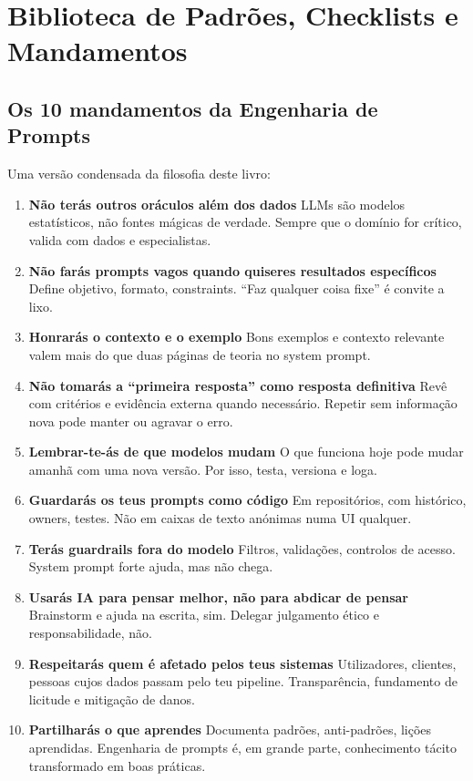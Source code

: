 \chapter{Biblioteca de Padrões, Checklists e Mandamentos}
\label{ap:padroes}

\section{Os 10 mandamentos da Engenharia de Prompts}

Uma versão condensada da filosofia deste livro:

\begin{enumerate}[leftmargin=*]
\item \textbf{Não terás outros oráculos além dos dados}
LLMs são modelos estatísticos, não fontes mágicas de verdade. Sempre que o domínio for crítico, valida com dados e especialistas.
\item \textbf{Não farás prompts vagos quando quiseres resultados específicos}
Define objetivo, formato, constraints. “Faz qualquer coisa fixe” é convite a lixo.
\item \textbf{Honrarás o contexto e o exemplo}
Bons exemplos e contexto relevante valem mais do que duas páginas de teoria no system prompt.
\item \textbf{Não tomarás a “primeira resposta” como resposta definitiva}
Revê com critérios e evidência externa quando necessário. Repetir sem informação nova pode manter ou agravar o erro.
\item \textbf{Lembrar-te-ás de que modelos mudam}
O que funciona hoje pode mudar amanhã com uma nova versão. Por isso, testa, versiona e loga.
\item \textbf{Guardarás os teus prompts como código}
Em repositórios, com histórico, owners, testes. Não em caixas de texto anónimas numa UI qualquer.
\item \textbf{Terás guardrails fora do modelo}
Filtros, validações, controlos de acesso. System prompt forte ajuda, mas não chega.
\item \textbf{Usarás IA para pensar melhor, não para abdicar de pensar}
Brainstorm e ajuda na escrita, sim. Delegar julgamento ético e responsabilidade, não.
\item \textbf{Respeitarás quem é afetado pelos teus sistemas}
Utilizadores, clientes, pessoas cujos dados passam pelo teu pipeline. Transparência, fundamento de licitude e mitigação de danos.
\item \textbf{Partilharás o que aprendes}
Documenta padrões, anti-padrões, lições aprendidas. Engenharia de prompts é, em grande parte, conhecimento tácito transformado em boas práticas.
\end{enumerate}

